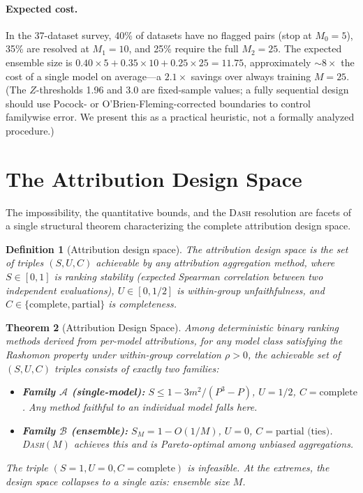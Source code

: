 \documentclass{article}
\newtheorem{theorem}{Theorem}
\newtheorem{definition}[theorem]{Definition}
\newcommand{\DASH}{\textsc{Dash}}
\begin{document}
\paragraph{Expected cost.}
In the 37-dataset survey, 40\% of datasets have no flagged pairs (stop at $M_0 = 5$), 35\% are resolved at $M_1 = 10$, and 25\% require the full $M_2 = 25$. The expected ensemble size is $0.40 \times 5 + 0.35 \times 10 + 0.25 \times 25 = 11.75$, approximately ${\sim}8\times$ the cost of a single model on average---a $2.1\times$ savings over always training $M = 25$.
(The $Z$-thresholds 1.96 and 3.0 are fixed-sample values; a fully sequential design should use Pocock- or O'Brien-Fleming-corrected boundaries to control familywise error. We present this as a practical heuristic, not a formally analyzed procedure.)


\section{The Attribution Design Space}
\label{sec:design-space}

The impossibility, the quantitative bounds, and the \DASH{} resolution are facets of a single structural theorem characterizing the complete attribution design space.

\begin{definition}[Attribution design space]
\label{def:design-space-def}
The \emph{attribution design space} is the set of triples $(S, U, C)$ achievable by any attribution aggregation method, where $S \in [0,1]$ is ranking stability (expected Spearman correlation between two independent evaluations), $U \in [0, 1/2]$ is within-group unfaithfulness, and $C \in \{\text{complete}, \text{partial}\}$ is completeness.
\end{definition}

\begin{theorem}[Attribution Design Space]
\label{thm:design-space-main}
Among deterministic binary ranking methods derived from per-model attributions, for any model class satisfying the Rashomon property under within-group correlation $\rho > 0$, the achievable set of $(S, U, C)$ triples consists of exactly two families:
\begin{itemize}
    \item \textbf{Family $\mathcal{A}$ (single-model):} $S \leq 1 - 3m^2/(P^3{-}P)$, $U = 1/2$, $C = \text{complete}$. Any method faithful to an individual model falls here.
    \item \textbf{Family $\mathcal{B}$ (ensemble):} $S_M = 1 - O(1/M)$, $U = 0$, $C = \text{partial (ties)}$. \DASH{}$(M)$ achieves this and is Pareto-optimal among unbiased aggregations.
\end{itemize}
The triple $(S{=}1, U{=}0, C{=}\text{complete})$ is infeasible. At the extremes, the design space collapses to a single axis: ensemble size $M$.
\end{theorem}
\end{document}
